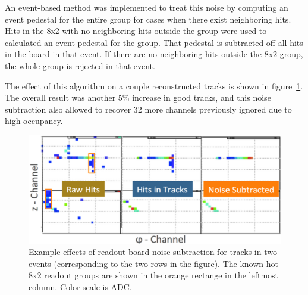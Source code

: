 An event-based method was implemented to treat this noise by computing an event pedestal for the entire group for cases when there exist neighboring hits.
Hits in the 8x2 with no neighboring hits outside the group were used to calculated an event pedestal for the group. That pedestal is subtracted off all hits in the board in that event. If there are no neighboring hits outside the 8x2 group, the whole group is rejected in that event. 

The effect of this algorithm on a couple reconstructed tracks is shown in figure~\ref{fig:HotBoardSubtract}.  The overall result was another 5\% increase in good tracks, and this noise subtraction also allowed to recover 32 more channels previously ignored due to high occupancy.


\begin{figure}[htbp]\centering
  \includegraphics[width=13cm]{fig_rtpc/HotBoardSubtract.png}
  \caption{Example effects of readout board noise subtraction for tracks in two events (corresponding to the two rows in the figure).  The known hot 8x2 readout groups are shown in the orange rectange in the leftmost column.  Color scale is ADC.\label{fig:HotBoardSubtract}}
\end{figure}

